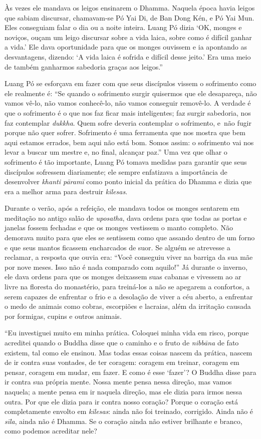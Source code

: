 Às vezes ele mandava os leigos ensinarem o Dhamma. Naquela época havia
leigos que sabiam discursar, chamavam-se Pó Yai Di, de Ban Dong Kén, e
Pó Yai Mun. Eles conseguiam falar o dia ou a noite inteira. Luang Pó
dizia `OK, monges e noviços, ouçam um leigo discursar sobre a vida
laica, sobre como é difícil ganhar a vida.' Ele dava oportunidade para
que os monges ouvissem e ia apontando as desvantagens, dizendo: `A vida
laica é sofrida e difícil desse jeito.' Era uma meio de também ganharmos
sabedoria graças aos leigos.''

Luang Pó se esforçava em fazer com que seus discípulos vissem o
sofrimento como ele realmente é: ``Se quando o sofrimento surgir
quisermos que ele desapareça, não vamos vê-lo, não vamos conhecê-lo, não
vamos conseguir removê-lo. A verdade é que o sofrimento é o que nos faz
ficar mais inteligentes; faz surgir sabedoria, nos faz contemplar
\emph{dukkha}. Quem sofre deveria contemplar o sofrimento, e~não fugir
porque não quer sofrer. Sofrimento é uma ferramenta que nos mostra que
bem aqui estamos errados, bem aqui não está bom. Somos assim: o
sofrimento vai nos levar a buscar um mestre e, no final, alcançar paz.''
Uma vez que olhar o sofrimento é tão importante, Luang Pó tomava medidas
para garantir que seus discípulos sofressem diariamente; ele sempre
enfatizava a importância de desenvolver \emph{khanti pāramī} como ponto
inicial da prática do Dhamma e dizia que era a melhor arma para destruir
\emph{kilesas}.

Durante o verão, após a refeição, ele mandava todos os monges sentarem
em meditação no antigo salão de \emph{uposatha}, dava ordens para que
todas as portas e janelas fossem fechadas e que os monges vestissem o
manto completo. Não demorava muito para que eles se sentissem como que
assando dentro de um forno e que seus mantos ficassem encharcados de
suor. Se alguém se atrevesse a reclamar, a resposta que ouvia era:
``Você conseguiu viver na barriga da sua mãe por nove meses. Isso não é
nada comparado com aquilo!'' Já durante o inverno, ele dava ordens para
que os monges deixassem suas cabanas e vivessem ao ar livre na floresta
do monastério, para treiná-los a não se apegarem a confortos, a serem
capazes de enfrentar o frio e a desolação de viver a céu aberto, a
enfrentar o medo de animais como cobras, escorpiões e lacraias, além da
irritação causada por formigas, cupins e outros animais.

``Eu investiguei muito em minha prática. Coloquei minha vida em risco,
porque acreditei quando o Buddha disse que o caminho e o fruto de
\emph{nibbāna} de fato existem, tal como ele ensinou. Mas todas essas
coisas nascem da prática, nascem de ir contra suas vontades, de ter
coragem: coragem em treinar, coragem em pensar, coragem em mudar, em
fazer. E como é esse `fazer'? O Buddha disse para ir contra sua própria
mente. Nossa mente pensa nessa direção, mas vamos naquela; a mente pensa
em ir naquela direção, mas ele dizia para irmos nessa outra. Por que ele
dizia para ir contra nosso coração? Porque o coração está completamente
envolto em \emph{kilesas}: ainda não foi treinado, corrigido. Ainda não
é \emph{sīla}, ainda não é Dhamma. Se o coração ainda não estiver
brilhante e branco, como podemos acreditar nele?

